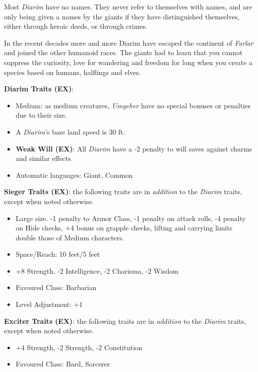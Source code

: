Most \emph{Diarim} have no names. They never refer to themselves with names,
and are only being given a names by the giants if they have distinguished
themselves, either through heroic deeds, or through crimes.

In the recent decades more and more Diarim have escaped the continent
of \emph{Farlar} and joined the other humanoid races. The giants had to learn
that you cannot suppress the curiosity, love for wandering and freedom for long
when you create a species based on humans, halflings and elves.

\begin{35e}
  \textbf{Diarim Traits (EX)}:
  \begin{itemize}[noitemsep]
    \item Medium: as medium creatures, \emph{Umgeher} have no special bonuses or
    penalties due to their size.
    \item A \emph{Diarim}'s base land speed is 30 ft.
    \item \textbf{Weak Will (EX)}: All \emph{Diarim} have a -2 penalty to will
    saves against charms and similar effects.
    \item Automatic languages: Giant, Common
  \end{itemize}

  \textbf{Sieger Traits (EX)}: the following traits are in \emph{addition} to
  the \emph{Diarim} traits, except when noted otherwise.
  \begin{itemize}[noitemsep]
    \item Large size. -1 penalty to Armor Class, -1 penalty on attack rolls,
    -4 penalty on Hide checks, +4 bonus on grapple checks, lifting and
    carrying limits double those of Medium characters.
    \item Space/Reach: 10 feet/5 feet
    \item +8 Strength, -2 Intelligence, -2 Charisma, -2 Wisdom
    \item Favoured Class: Barbarian
    \item Level Adjustment: +1
  \end{itemize}

  \textbf{Exciter Traits (EX)}: the following traits are in \emph{addition} to
  the \emph{Diarim} traits, except when noted otherwise.
  \begin{itemize}[noitemsep]
    \item +4 Strength, -2 Strength, -2 Constitution
    \item Favoured Class: Bard, Sorcerer
  \end{itemize}
\end{35e}
